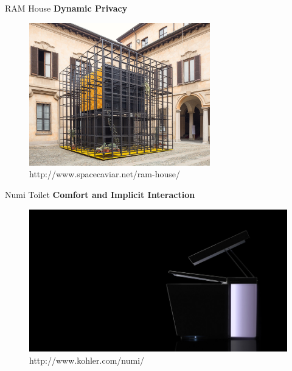 \documentclass[10pt]{beamer}
\begin{document}
\begin{frame}{RAM House}
	\textbf{Dynamic Privacy}\\
	\vspace{3mm}
	\begin{figure}[H]
	\includegraphics[width=0.7\textwidth]{images/1.jpg}
	\caption{http://www.spacecaviar.net/ram-house/}
	\end{figure}
\end{frame}

\begin{frame}{Numi Toilet}
	\textbf{Comfort and Implicit Interaction}\\
	\vspace{3mm}
	\begin{figure}[H]
	\includegraphics[width=\textwidth]{images/3.jpg}
	\caption{http://www.kohler.com/numi/}
	\end{figure}
\end{frame}
\end{document}
